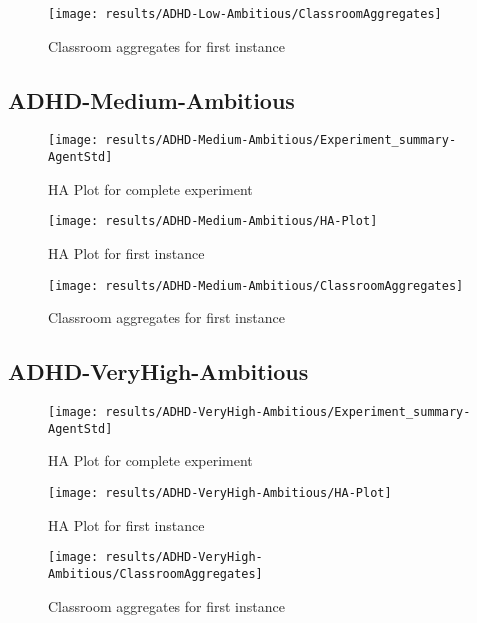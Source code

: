 \begin{figure}[H]
    \centering
    \texttt{[image: results/ADHD-Low-Ambitious/ClassroomAggregates]}
    \caption{Classroom aggregates for first instance}
\end{figure}

\subsection{ADHD-Medium-Ambitious}

\begin{figure}[H]
    \centering
    \texttt{[image: results/ADHD-Medium-Ambitious/Experiment\_summary-AgentStd]}
    \caption{HA Plot for complete experiment}
\end{figure}

\begin{figure}[H]
    \centering
    \texttt{[image: results/ADHD-Medium-Ambitious/HA-Plot]}
    \caption{HA Plot for first instance}
\end{figure}

\begin{figure}[H]
    \centering
    \texttt{[image: results/ADHD-Medium-Ambitious/ClassroomAggregates]}
    \caption{Classroom aggregates for first instance}
\end{figure}

\subsection{ADHD-VeryHigh-Ambitious}

\begin{figure}[H]
    \centering
    \texttt{[image: results/ADHD-VeryHigh-Ambitious/Experiment\_summary-AgentStd]}
    \caption{HA Plot for complete experiment}
\end{figure}

\begin{figure}[H]
    \centering
    \texttt{[image: results/ADHD-VeryHigh-Ambitious/HA-Plot]}
    \caption{HA Plot for first instance}
\end{figure}

\begin{figure}[H]
    \centering
    \texttt{[image: results/ADHD-VeryHigh-Ambitious/ClassroomAggregates]}
    \caption{Classroom aggregates for first instance}
    \label{result:VHA-Classroom}
\end{figure}

